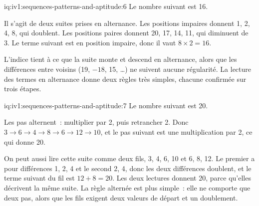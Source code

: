 \begin{solution}{iq:iv1:sequences-patterns-and-aptitude:6}
Le nombre suivant est 16.

Il s'agit de deux suites prises en alternance. Les positions impaires donnent 1, 2, 4, 8, qui doublent. Les positions paires donnent 20, 17, 14, 11, qui diminuent de 3. Le terme suivant est en position impaire, donc il vaut $8 \times 2 = 16$.

L'indice tient à ce que la suite monte et descend en alternance, alors que les différences entre voisins (19, $-18$, 15, \dots) ne suivent aucune régularité. La lecture des termes en alternance donne deux règles très simples, chacune confirmée sur trois étapes.

\end{solution}

\begin{solution}{iq:iv1:sequences-patterns-and-aptitude:7}
Le nombre suivant est 20.

Les pas alternent~: multiplier par 2, puis retrancher 2. Donc $3 \to 6 \to 4 \to 8 \to 6 \to 12 \to 10$, et le pas suivant est une multiplication par 2, ce qui donne 20.

On peut aussi lire cette suite comme deux fils, 3, 4, 6, 10 et 6, 8, 12. Le premier a pour différences 1, 2, 4 et le second 2, 4, donc les deux différences doublent, et le terme suivant du fil est $12 + 8 = 20$. Les deux lectures donnent 20, parce qu'elles décrivent la même suite. La règle alternée est plus simple~: elle ne comporte que deux pas, alors que les fils exigent deux valeurs de départ et un doublement.

\end{solution}

